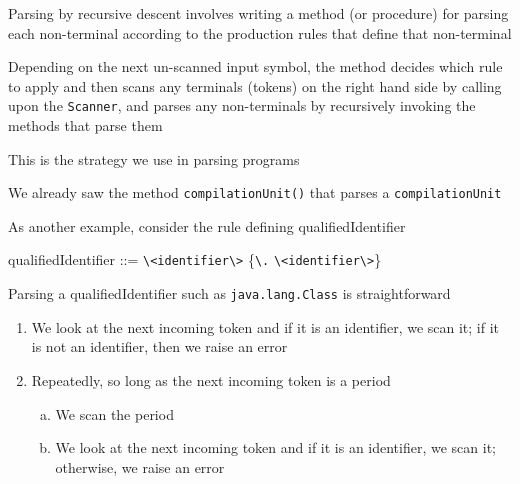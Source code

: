 \documentclass[8pt,a4paper,compress]{beamer}
\newenvironment{spaced}
{
\smallskip
\hspace{.5cm}
\begin{minipage}[c]{\textwidth}
}
{
\end{minipage}
\smallskip
}
\begin{document}
\begin{frame}[fragile]
\pause

Parsing by recursive descent involves writing a method (or procedure) for parsing each non-terminal according to the production rules that define that non-terminal

\pause
\bigskip

Depending on the next un-scanned input symbol, the method decides which rule to apply and then scans any terminals (tokens) on the right hand side by calling upon the \lstinline{Scanner}, and parses any non-terminals by recursively invoking the methods that parse them

\pause
\bigskip

This is the strategy we use in parsing \jmm programs

\pause
\bigskip

We already saw the method \lstinline{compilationUnit()} that parses a \jmm \lstinline{compilationUnit}

\pause
\bigskip

As another example, consider the rule defining qualifiedIdentifier

\text{ }
\begin{spaced}
\begin{production}
qualifiedIdentifier ::= \lstinline{\<identifier\>} \{\lstinline{\.} \lstinline{\<identifier\>}\}
\end{production}
\end{spaced}

\pause

Parsing a qualifiedIdentifier such as \lstinline{java.lang.Class} is straightforward
\begin{enumerate}
\item We look at the next incoming token and if it is an identifier, we scan it; if it is not an identifier, then we raise an error
\item Repeatedly, so long as the next incoming token is a period
\begin{enumerate}[a.]
\item We scan the period
\item We look at the next incoming token and if it is an identifier, we scan it; otherwise, we raise an error
\end{enumerate}
\end{enumerate}
\end{frame}
\end{document}
